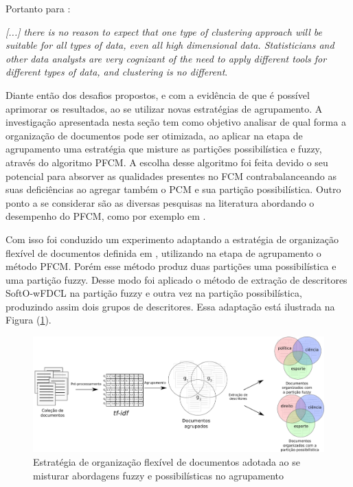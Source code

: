 Portanto para :
\begin{citacao}
  {\it [...] there is no reason to expect that one type of clustering approach will
  be suitable for all types of data, even all high dimensional data. Statisticians and other
  data analysts are very cognizant of the need to apply different tools for different types of
  data, and clustering is no different\/}.
\end{citacao}

Diante então dos desafios propostos, e com a evidência de que é possível aprimorar os resultados, ao
se utilizar novas estratégias de agrupamento. A investigação apresentada nesta seção tem como
objetivo analisar de qual forma a organização de documentos pode ser otimizada, ao aplicar na etapa
de agrupamento uma estratégia que misture as partições possibilística e fuzzy, através do algoritmo
PFCM. A escolha desse algoritmo foi feita devido o seu potencial para absorver as qualidades
presentes no FCM contrabalanceando as suas deficiências ao agregar também o PCM e sua partição
possibilística. Outro ponto a se considerar são as diversas pesquisas na literatura abordando o
desempenho do PFCM, 
como por exemplo em .

Com isso foi conduzido um experimento adaptando a estratégia de organização flexível de documentos
definida em ,
utilizando na etapa de agrupamento o método PFCM. Porém esse método produz duas partições uma
possibilística e uma partição fuzzy. Desse modo foi aplicado o método de extração de descritores
SoftO-wFDCL na partição fuzzy e outra vez na partição possibilística, produzindo assim dois grupos de
descritores. Essa adaptação está ilustrada na Figura (\ref{fig:flexibleorganization}).

\begin{figure}[!htp] 
  \centering
  \includegraphics[width=1.0\columnwidth]{assets/process_pfcm.pdf} 
  \caption{Estratégia de organização flexível de documentos adotada ao se misturar abordagens fuzzy
  e possibilísticas no agrupamento} 
  \label{fig:flexibleorganization} 
\end{figure}

